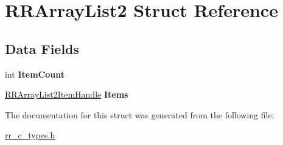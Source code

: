 \hypertarget{struct_r_r_array_list2}{
\section{\-R\-R\-Array\-List2 \-Struct \-Reference}
\label{struct_r_r_array_list2}
}
\subsection*{\-Data \-Fields}
\begin{DoxyCompactItemize}
\item 
\hypertarget{struct_r_r_array_list2_ab970c710c7f3897df3c63f76dc5a0793}{
int {\bfseries \-Item\-Count}}
\label{struct_r_r_array_list2_ab970c710c7f3897df3c63f76dc5a0793}

\item 
\hypertarget{struct_r_r_array_list2_aff798cb8027dcb29fd09e5396f8428fe}{
\hyperlink{struct_r_r_array_list2_item}{\-R\-R\-Array\-List2\-Item\-Handle} {\bfseries \-Items}}
\label{struct_r_r_array_list2_aff798cb8027dcb29fd09e5396f8428fe}

\end{DoxyCompactItemize}


\-The documentation for this struct was generated from the following file\-:\begin{DoxyCompactItemize}
\item 
\hyperlink{rr__c__types_8h}{rr\-\_\-c\-\_\-types.\-h}\end{DoxyCompactItemize}
